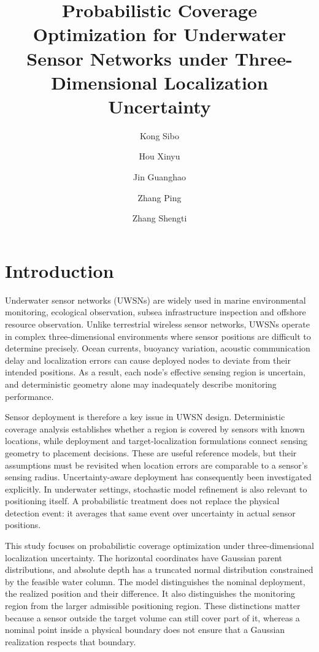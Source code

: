\documentclass[fleqn,10pt]{wlscirep}
\title{Probabilistic Coverage Optimization for Underwater Sensor Networks under Three-Dimensional Localization Uncertainty}
\author[1,*]{Kong Sibo}
\author[2]{Hou Xinyu}
\author[1]{Jin Guanghao}
\author[1]{Zhang Ping}
\author[2]{Zhang Shengti}
\affil[1]{Beijing Polytechnic University, Beijing 100176, China}
\affil[2]{Beijing Information Science and Technology University, Beijing 100192, China}
\affil[*]{Corresponding author: kongsibo@bpu.edu.cn}
\begin{document}
\flushbottom\maketitle\thispagestyle{empty}

\section*{Introduction}
Underwater sensor networks (UWSNs) are widely used in marine environmental monitoring, ecological observation, subsea infrastructure inspection and offshore resource observation\cite{akyildiz2005}. Unlike terrestrial wireless sensor networks, UWSNs operate in complex three-dimensional environments where sensor positions are difficult to determine precisely. Ocean currents, buoyancy variation, acoustic communication delay and localization errors can cause deployed nodes to deviate from their intended positions. As a result, each node's effective sensing region is uncertain, and deterministic geometry alone may inadequately describe monitoring performance.

Sensor deployment is therefore a key issue in UWSN design. Deterministic coverage analysis establishes whether a region is covered by sensors with known locations\cite{huang2003}, while deployment and target-localization formulations connect sensing geometry to placement decisions\cite{zou2004}. These are useful reference models, but their assumptions must be revisited when location errors are comparable to a sensor's sensing radius. Uncertainty-aware deployment has consequently been investigated explicitly\cite{zouuncertainty2004}. In underwater settings, stochastic model refinement is also relevant to positioning itself\cite{zhao2020}. A probabilistic treatment does not replace the physical detection event: it averages that same event over uncertainty in actual sensor positions.

This study focuses on probabilistic coverage optimization under three-dimensional localization uncertainty. The horizontal coordinates have Gaussian parent distributions, and absolute depth has a truncated normal distribution constrained by the feasible water column. The model distinguishes the nominal deployment, the realized position and their difference. It also distinguishes the monitoring region from the larger admissible positioning region. These distinctions matter because a sensor outside the target volume can still cover part of it, whereas a nominal point inside a physical boundary does not ensure that a Gaussian realization respects that boundary.
\end{document}
